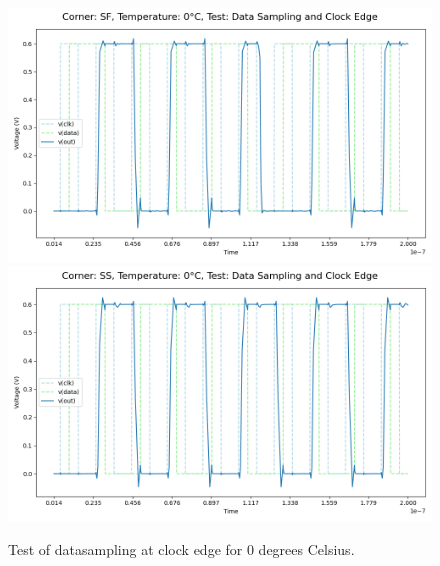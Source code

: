 \begin{figure}[H]
    \vspace{5pt}
    \includegraphics[height= 0.21\textheight]{figures/aimspice/SF/0/W1.csv.png}
    \vspace{5pt}
    \includegraphics[height= 0.21\textheight]{figures/aimspice/SS/0/W1.csv.png}
    \caption{Test of datasampling at clock edge for 0 degrees Celsius.}
    \label{fig:aimspice_W1_0}
\end{figure}

\pagebreak

